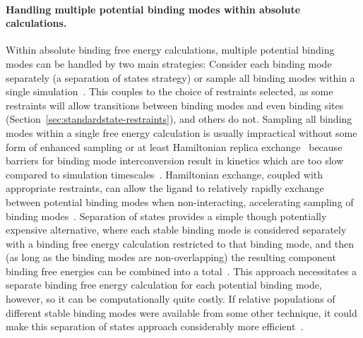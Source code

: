 \documentclass[9pt,bestpractices]{livecoms}
\begin{document}
\paragraph{Handling multiple potential binding modes within absolute calculations.}
Within absolute binding free energy calculations, multiple potential binding modes can be handled by two main strategies: Consider each binding mode separately (a separation of states strategy) or sample all binding modes within a single simulation~\cite{mobley2012perspective}.
This couples to the choice of restraints selected, as some restraints will allow transitions between binding modes and even binding sites (Section~\ref{sec:standardstate-restraints}), and others do not.
%
Sampling all binding modes within a single free energy calculation is usually impractical without some form of enhanced sampling or at least Hamiltonian replica exchange~\cite{wang2013identifying} because barriers for binding mode interconversion result in kinetics which are too slow compared to simulation timescales~\cite{mobley2006use, palma2012computation,mobley2012perspective, gill2018binding}.
Hamiltonian exchange, coupled with appropriate restraints, can allow the ligand to relatively rapidly exchange between potential binding modes when non-interacting, accelerating sampling of binding modes~\cite{wang2013identifying}.
%
Separation of states provides a simple though potentially expensive alternative, where each stable binding mode is considered separately with a binding free energy calculation restricted to that binding mode, and then (as long as the binding modes are non-overlapping) the resulting component binding free energies can be combined into a total~\cite{mobley2006use, mobley2012perspective}.
This approach necessitates a separate binding free energy calculation for each potential binding mode, however, so it can be computationally quite costly.
If relative populations of different stable binding modes were available from some other technique, it could make this separation of states approach considerably more efficient~\cite{mobley2012perspective, gill2018binding}.
%
\end{document}
